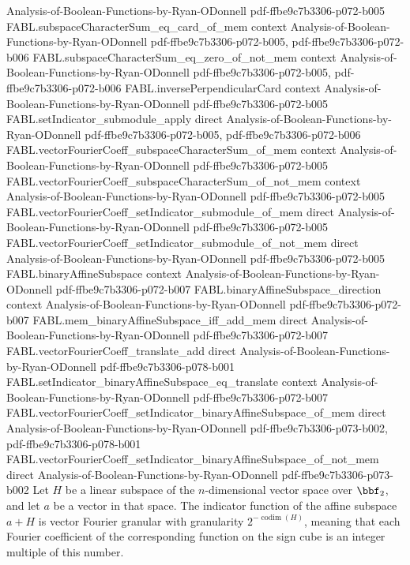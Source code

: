 \begin{theorem}
  {Analysis-of-Boolean-Functions-by-Ryan-ODonnell}
  {pdf-ffbe9c7b3306-p072-b005}
\proofstep
  {FABL.subspaceCharacterSum_eq_card_of_mem}
  {context}
  {Analysis-of-Boolean-Functions-by-Ryan-ODonnell}
  {pdf-ffbe9c7b3306-p072-b005,
    pdf-ffbe9c7b3306-p072-b006}
\proofstep
  {FABL.subspaceCharacterSum_eq_zero_of_not_mem}
  {context}
  {Analysis-of-Boolean-Functions-by-Ryan-ODonnell}
  {pdf-ffbe9c7b3306-p072-b005,
    pdf-ffbe9c7b3306-p072-b006}
\proofstep
  {FABL.inversePerpendicularCard}
  {context}
  {Analysis-of-Boolean-Functions-by-Ryan-ODonnell}
  {pdf-ffbe9c7b3306-p072-b005}
\proofstep
  {FABL.setIndicator_submodule_apply}
  {direct}
  {Analysis-of-Boolean-Functions-by-Ryan-ODonnell}
  {pdf-ffbe9c7b3306-p072-b005,
    pdf-ffbe9c7b3306-p072-b006}
\proofstep
  {FABL.vectorFourierCoeff_subspaceCharacterSum_of_mem}
  {context}
  {Analysis-of-Boolean-Functions-by-Ryan-ODonnell}
  {pdf-ffbe9c7b3306-p072-b005}
\proofstep
  {FABL.vectorFourierCoeff_subspaceCharacterSum_of_not_mem}
  {context}
  {Analysis-of-Boolean-Functions-by-Ryan-ODonnell}
  {pdf-ffbe9c7b3306-p072-b005}
\proofstep
  {FABL.vectorFourierCoeff_setIndicator_submodule_of_mem}
  {direct}
  {Analysis-of-Boolean-Functions-by-Ryan-ODonnell}
  {pdf-ffbe9c7b3306-p072-b005}
\proofstep
  {FABL.vectorFourierCoeff_setIndicator_submodule_of_not_mem}
  {direct}
  {Analysis-of-Boolean-Functions-by-Ryan-ODonnell}
  {pdf-ffbe9c7b3306-p072-b005}
\proofstep
  {FABL.binaryAffineSubspace}
  {context}
  {Analysis-of-Boolean-Functions-by-Ryan-ODonnell}
  {pdf-ffbe9c7b3306-p072-b007}
\proofstep
  {FABL.binaryAffineSubspace_direction}
  {context}
  {Analysis-of-Boolean-Functions-by-Ryan-ODonnell}
  {pdf-ffbe9c7b3306-p072-b007}
\proofstep
  {FABL.mem_binaryAffineSubspace_iff_add_mem}
  {direct}
  {Analysis-of-Boolean-Functions-by-Ryan-ODonnell}
  {pdf-ffbe9c7b3306-p072-b007}
\proofstep
  {FABL.vectorFourierCoeff_translate_add}
  {direct}
  {Analysis-of-Boolean-Functions-by-Ryan-ODonnell}
  {pdf-ffbe9c7b3306-p078-b001}
\proofstep
  {FABL.setIndicator_binaryAffineSubspace_eq_translate}
  {context}
  {Analysis-of-Boolean-Functions-by-Ryan-ODonnell}
  {pdf-ffbe9c7b3306-p072-b007}
\proofstep
  {FABL.vectorFourierCoeff_setIndicator_binaryAffineSubspace_of_mem}
  {direct}
  {Analysis-of-Boolean-Functions-by-Ryan-ODonnell}
  {pdf-ffbe9c7b3306-p073-b002,
    pdf-ffbe9c7b3306-p078-b001}
\proofstep
  {FABL.vectorFourierCoeff_setIndicator_binaryAffineSubspace_of_not_mem}
  {direct}
  {Analysis-of-Boolean-Functions-by-Ryan-ODonnell}
  {pdf-ffbe9c7b3306-p073-b002}
Let $H$ be a linear subspace of the $n$-dimensional vector space over $\bbf_2$, and let
$a$ be a vector in that space. The indicator function of the affine subspace $a+H$ is
vector Fourier granular with granularity $2^{-\operatorname{codim}(H)}$, meaning that
each Fourier coefficient of the corresponding function on the sign cube is an integer
multiple of this number.
\end{theorem}

